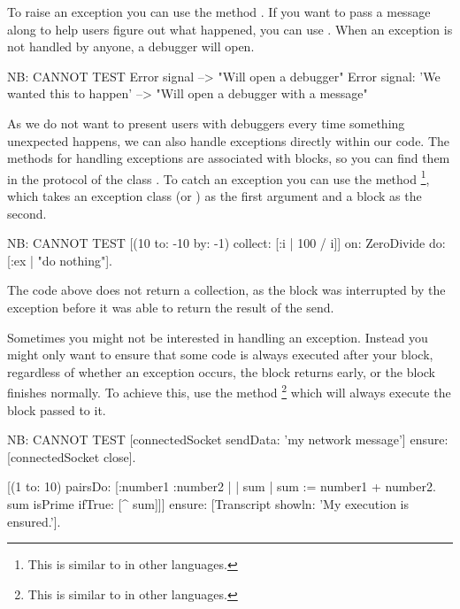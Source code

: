 \documentclass[a4paper,10pt,twoside]{book}
\begin{document}
To raise an exception you can use the method .
If you want to pass a message along to help users figure out what happened, you can use .
When an exception is not handled by anyone, a debugger will open.

\begin{code}{NB: CANNOT TEST}
Error signal --> "Will open a debugger"
Error signal: 'We wanted this to happen' --> "Will open a debugger with a message"
\end{code}

As we do not want to present users with debuggers every time something unexpected happens, we can also handle exceptions directly within our code.
The methods for handling exceptions are associated with blocks, so you can find them in the  protocol of the class .
To catch an exception you can use the method \footnote{This is similar to  in other languages.}, which takes an exception class (or ) as the first argument and a block as the second.

\begin{code}{NB: CANNOT TEST}
[(10 to: -10 by: -1) collect: [:i | 100 / i]]
   on: ZeroDivide
   do: [:ex | "do nothing"].
\end{code}

The code above does not return a collection, as the block was interrupted by the  exception before it was able to return the result of the  send.

Sometimes you might not be interested in handling an exception.
Instead you might only want to ensure that some code is always executed after your block, regardless of whether an exception occurs, the block returns early, or the block finishes normally.
To achieve this, use the method \footnote{This is similar to  in other languages.} which will always execute the block passed to it.

\begin{code}{NB: CANNOT TEST}
[connectedSocket sendData: 'my network message']
   ensure: [connectedSocket close].

[(1 to: 10) pairsDo: [:number1 :number2 | | sum |
	sum := number1 + number2.
	sum isPrime ifTrue: [^ sum]]]
		ensure: [Transcript showln: 'My execution is ensured.'].
\end{code}

\end{document}
